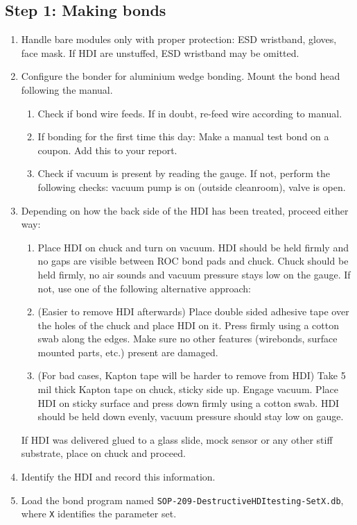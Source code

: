 \documentclass[10pt]{unlsilabsop}
\begin{document}
\subsection{Step 1: Making bonds}
\begin{enumerate}
    \item Handle bare modules only with proper protection: ESD wristband, gloves, face mask. If HDI are unstuffed, ESD wristband may be omitted.
    \item Configure the bonder for aluminium wedge bonding. Mount the bond head following the manual.
    \begin{enumerate}
	\item Check if bond wire feeds. If in doubt, re-feed wire according to manual.
	\item If bonding for the first time this day: Make a manual test bond on a coupon. Add this to your report.
	\item Check if vacuum is present by reading the gauge. If not, perform the following checks: vacuum pump is on (outside cleanroom), valve is open.
    \end{enumerate}
    \item Depending on how the back side of the HDI has been treated, proceed either way:
    \begin{enumerate}
	\item Place HDI on chuck and turn on vacuum. HDI should be held firmly and no gaps are visible between ROC bond pads and chuck. Chuck should be held firmly, no air sounds and vacuum pressure stays low on the gauge. If not, use one of the following alternative approach:
	\item (Easier to remove HDI afterwards) Place double sided adhesive tape over the holes of the chuck and place HDI on it. Press firmly using a cotton swab along the edges. Make sure no other features (wirebonds, surface mounted parts, etc.) present are damaged.
	\item (For bad cases, Kapton tape will be harder to remove from HDI) Take 5\,mil thick Kapton tape on chuck, sticky side up. Engage vacuum. Place HDI on sticky surface and press down firmly using a cotton swab. HDI should be held down evenly, vacuum pressure should stay low on gauge.
    \end{enumerate}
    If HDI was delivered glued to a glass slide, mock sensor or any other stiff substrate, place on chuck and proceed.
    \item Identify the HDI and record this information.
    \item Load the bond program named \texttt{SOP-209-DestructiveHDItesting-SetX.db}, where \texttt{X} identifies the parameter set.

\end{enumerate}
\end{document}
